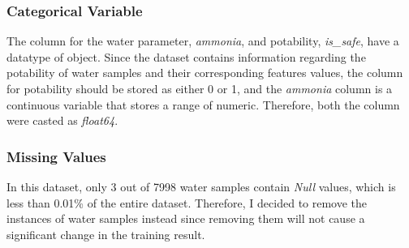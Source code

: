\documentclass[conference]{IEEEtran}
\begin{document}
\subsubsection{Categorical Variable}
The column for the water parameter, \emph{ammonia}, and potability, \emph{is\_safe}, have a datatype of object. Since the dataset contains information regarding the potability of water samples and their corresponding features values, the column for potability should be stored as either 0 or 1, and the \emph{ammonia} column is a continuous variable that stores a range of numeric. Therefore, both the column were casted as \emph{float64}.  

\subsubsection{Missing Values}
In this dataset, only 3 out of 7998 water samples contain \emph{Null} values, which is less than 0.01\% of the entire dataset. Therefore, I decided to remove the instances of water samples instead since removing them will not cause a significant change in the training result.
\end{document}
